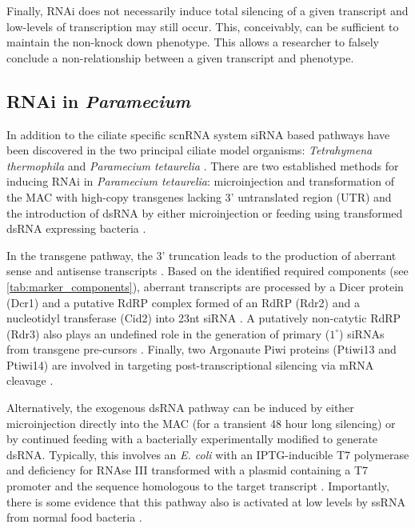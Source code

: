 Finally, RNAi does not necessarily induce total silencing
of a given transcript and low-levels of transcription may still occur.
This, conceivably, can be sufficient to maintain the non-knock down phenotype.
This allows a researcher to falsely conclude a non-relationship between
a given transcript and phenotype.

\subsection{RNAi in \textit{Paramecium}}

In addition to the ciliate specific scnRNA system 
siRNA based pathways have been discovered in the two principal
ciliate model organisms: \textit{Tetrahymena thermophila} \citep{Collins2006,Yao2005}
and \textit{Paramecium tetaurelia} \citep{Galvani2001,Galvani2002}. 
There are two established methods for inducing RNAi in \textit{Paramecium tetaurelia}:
microinjection and transformation of the MAC with high-copy transgenes lacking 3' untranslated
region (UTR) \citep{Galvani2001} and the introduction of dsRNA by either
microinjection or feeding using transformed dsRNA expressing bacteria 
\citep{Galvani2002}.

In the transgene pathway, the 3' truncation leads to the production of aberrant
sense and antisense transcripts \citep{Galvani2001,Marker2010,Beisson2010b}.
Based on the identified required components (see \cref{tab:marker_components}), 
aberrant transcripts
are processed by a Dicer protein (Dcr1) \citep{Lepere2009} and
a putative RdRP complex formed of an RdRP (Rdr2) and a nucleotidyl
transferase (Cid2) \citep{Marker2014} into 23nt siRNA \citep{Lepere2009}. 
A putatively non-catytic 
RdRP (Rdr3) also plays an undefined role in the generation
of primary (\(1^{\circ}\)) siRNAs from transgene pre-cursors \citep{Marker2010,Marker2014}.
Finally, two Argonaute Piwi proteins (Ptiwi13 and Ptiwi14) \citep{Bouhouche2011} 
are involved in targeting post-transcriptional silencing via mRNA
cleavage \citep{Bouhouche2011,Marker2014}.


Alternatively, the exogenous dsRNA pathway can be induced by either microinjection directly
into the MAC (for a transient 48 hour long silencing) or by continued feeding
with a bacterially experimentally modified to generate dsRNA.
Typically, this involves an \textit{E. coli} 
with an IPTG-inducible T7 polymerase and 
deficiency for RNAse III transformed with
a plasmid containing a T7 promoter and the sequence
homologous to the target transcript
\citep{Fire1998,Timmons2001,Galvani2002}.
Importantly, there is some evidence that this pathway also is activated at low
levels by ssRNA from normal food bacteria \citep{Carradec2015}.

